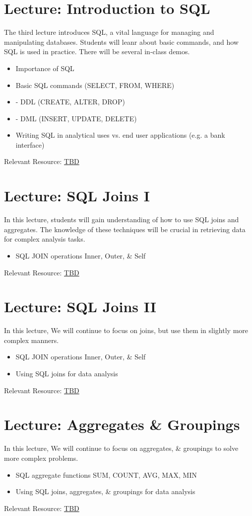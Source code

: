 \documentclass[11pt, letterpaper]{article}
\let\oldsection\section
\renewcommand\section{\clearpage\oldsection}
\begin{document}
	\section*{Lecture: Introduction to SQL}
	The third lecture introduces SQL, a vital language for managing and manipulating databases. Students will leanr about basic commands, and how SQL is used in practice. There will be several in-class demos.
	\begin{itemize}
		\item Importance of SQL
		\item Basic SQL commands (SELECT, FROM, WHERE)
		\item - DDL (CREATE, ALTER, DROP)
		\item - DML (INSERT, UPDATE, DELETE)
		\item Writing SQL in analytical uses vs. end user applications (e.g. a bank interface)
	\end{itemize}
	Relevant Resource: \href{https://example.com}{TBD}
	
	\section*{Lecture: SQL Joins I}
	In this lecture, students will gain understanding of how to use SQL joins and aggregates. The knowledge of these techniques will be crucial in retrieving data for complex analysis tasks.
	\begin{itemize}
		\item SQL JOIN operations {Inner, Outer, \& Self}
	\end{itemize}
	Relevant Resource: \href{https://example.com}{TBD}
	
	\section*{Lecture: SQL Joins  II}
	In this lecture, We will continue to focus on joins, but use them in slightly more complex manners.
	\begin{itemize}
		\item SQL JOIN operations {Inner, Outer, \& Self}
		\item Using SQL joins for data analysis
	\end{itemize}
	Relevant Resource: \href{https://example.com}{TBD}
	
	\section*{Lecture: Aggregates \& Groupings}
	In this lecture, We will continue to focus on aggregates, \& groupings to solve more complex problems.
	\begin{itemize}
		\item SQL aggregate functions {SUM, COUNT, AVG, MAX, MIN}
		\item Using SQL joins, aggregates, \& groupings for data analysis
	\end{itemize}
	Relevant Resource: \href{https://example.com}{TBD}
		
\end{document}
